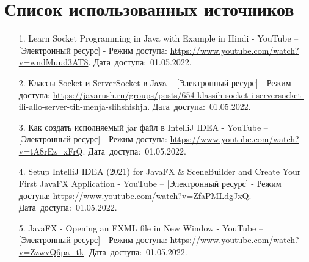 \documentclass[12pt, a4paper, simple]{eskdtext}
\begin{document}
    \section*{Список использованных источников}
    \begin{enumerate}
        \item[1.] Learn Socket Programming in Java with Example in Hindi - YouTube -- [Электронный ресурс]
        - Режим доступа: \url{https://www.youtube.com/watch?v=wndMuud3AT8}.
        Дата~доступа:~01.05.2022.
        \item[2.] Классы Socket и ServerSocket в Java -- [Электронный ресурс]
        - Режим доступа: \url{https://javarush.ru/groups/posts/654-klassih-socket-i-serversocket-ili-allo-server-tih-menja-slihshishjh}.
        Дата~доступа:~01.05.2022.
        \item[3.] Как создать исполняемый jar файл в IntelliJ IDEA - YouTube -- [Электронный ресурс]
        - Режим доступа: \url{https://www.youtube.com/watch?v=tA8rEz_xFrQ}.
        Дата~доступа:~01.05.2022.
        \item[4.] Setup IntelliJ IDEA (2021) for JavaFX \& SceneBuilder and Create Your First JavaFX Application - YouTube -- [Электронный ресурс]
        - Режим доступа: \url{https://www.youtube.com/watch?v=ZfaPMLdgJxQ}.
        Дата~доступа:~01.05.2022.
        \item[5.] JavaFX - Opening an FXML file in New Window - YouTube -- [Электронный ресурс]
        - Режим доступа: \url{https://www.youtube.com/watch?v=ZzwvQ6pa_tk}.
        Дата~доступа:~01.05.2022.
    \end{enumerate}
    \newpage
\end{document}
